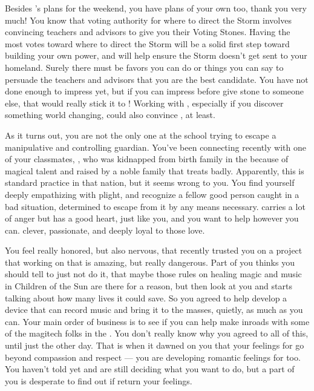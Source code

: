 \documentclass[char]{GL2020}
\begin{document}
Besides \cAntiChup{}'s plans for the weekend, you have plans of your own too, thank you very much! You know that voting authority for where to direct the Storm involves convincing teachers and advisors to give you their Voting Stones. Having the most votes toward where to direct the Storm will be a solid first step toward building your own power, and will help ensure the Storm doesn’t get sent to your homeland. Surely there must be favors you can do or things you can say to persuade the teachers and advisors that you are the best candidate. You have not done enough to impress \cBeetle{} yet, but if you can impress \cBeetle{\them} before \cBeetle{\they} give \cBeetle{\their} stone to someone else, that would really stick it to \cAntiChup{}! Working with \cHeadScientist{}, especially if you discover something world changing, could also convince \cHeadScientist{\them}, at least.  


As it turns out, you are not the only one at the school trying to escape a manipulative and controlling guardian. You've been connecting recently with one of your classmates, \cAdopted{\intro}, who was kidnapped from \cAdopted{\their} birth family in the \pFarm{} because of \cAdopted{\their} magical talent and raised by a noble family that treats \cAdopted{\them} badly. Apparently, this is standard practice in that nation, but it seems wrong to you. You find yourself deeply empathizing with \cAdopted{\their} plight, and recognize a fellow good person caught in a bad situation, determined to escape from it by any means necessary. \cAdopted{} carries a lot of anger but has a good heart, just like you, and you want to help \cAdopted{\them} however you can. \cAdopted{\Theyare} clever, passionate, and deeply loyal to those \cAdopted{\they} love\cAdopted{\verbs}. 

You feel really honored, but also nervous, that recently \cAdopted{\they} trusted you on a project that \cAdopted{\theyare} working on that is amazing, but really dangerous. Part of you thinks you should tell \cAdopted{} to just not do it, that maybe those rules on healing magic and music in Children of the Sun are there for a reason, but then \cAdopted{\they} look\cAdopted{\verbs} at you and starts talking about how many lives it could save. So you agreed to help \cAdopted{\them} develop a device that can record music and bring it to the masses, quietly, as much as you can. Your main order of business is to see if you can help \cAdopted{} make inroads with some of the magitech folks in the \pTech{}. You don’t really know why you agreed to all of this, until just the other day. That is when it dawned on you that your feelings for \cAdopted{} go beyond compassion and respect — you are developing romantic feelings for \cAdopted{\them} too. You haven't told \cAdopted{} yet and are still deciding what you want to do, but a part of you is desperate to find out if \cAdopted{\they} return your feelings.
\end{document}
